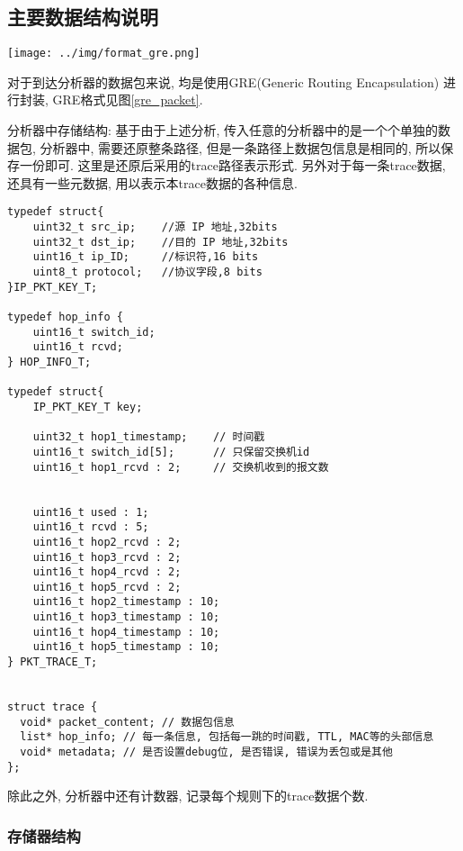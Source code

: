 {\begin{mdframed}[everyline=true]
\subsection{主要数据结构说明}

\begin{center}
\texttt{[image: ../img/format\_gre.png]}
\label{gre_packet}
\end{center}

对于到达分析器的数据包来说, 均是使用GRE(Generic Routing Encapsulation)
进行封装, GRE格式见图\ref{gre_packet}.

分析器中存储结构: 基于由于上述分析,
传入任意的分析器中的是一个个单独的数据包, 分析器中, 需要还原整条路径,
但是一条路径上数据包信息是相同的, 所以保存一份即可.
这里是还原后采用的trace路径表示形式.
另外对于每一条trace数据, 还具有一些元数据, 用以表示本trace数据的各种信息.

\begin{lstlisting}
typedef struct{
    uint32_t src_ip;    //源 IP 地址,32bits
    uint32_t dst_ip;    //目的 IP 地址,32bits
    uint16_t ip_ID;     //标识符,16 bits
    uint8_t protocol;   //协议字段,8 bits
}IP_PKT_KEY_T;

typedef hop_info {
    uint16_t switch_id;
    uint16_t rcvd;
} HOP_INFO_T;

typedef struct{
    IP_PKT_KEY_T key;

    uint32_t hop1_timestamp;    // 时间戳
    uint16_t switch_id[5];      // 只保留交换机id
    uint16_t hop1_rcvd : 2;     // 交换机收到的报文数


    uint16_t used : 1;
    uint16_t rcvd : 5;
    uint16_t hop2_rcvd : 2;
    uint16_t hop3_rcvd : 2;
    uint16_t hop4_rcvd : 2;
    uint16_t hop5_rcvd : 2;
    uint16_t hop2_timestamp : 10;
    uint16_t hop3_timestamp : 10;
    uint16_t hop4_timestamp : 10;
    uint16_t hop5_timestamp : 10;
} PKT_TRACE_T;


struct trace {
  void* packet_content; // 数据包信息
  list* hop_info; // 每一条信息, 包括每一跳的时间戳, TTL, MAC等的头部信息
  void* metadata; // 是否设置debug位, 是否错误, 错误为丢包或是其他
};
\end{lstlisting}

除此之外, 分析器中还有计数器, 记录每个规则下的trace数据个数.

\subsubsection{存储器结构}


\end{mdframed}}
